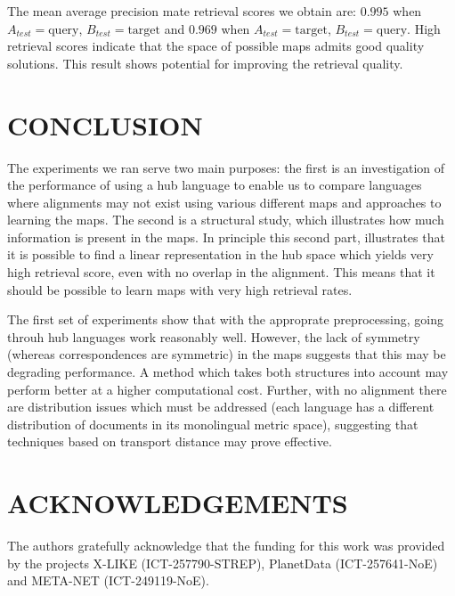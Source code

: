 \documentclass[twocolumn, draft]{article}
\begin{document}
The mean average precision mate retrieval scores we obtain are:
$0.995$ when $A_{test} = \text{query}$, $B_{test} =
\text{target}$ and $0.969$ when $A_{test} = \text{target}$,
$B_{test} = \text{query}$. High retrieval scores indicate that
the space of possible maps admits good quality solutions. This
result shows potential for improving the retrieval quality.
\vspace{-0.2cm}
\section{CONCLUSION}
\vspace{-0.2cm}
The experiments we ran serve two main purposes: the first is an
investigation of the performance of using a hub language to
enable us to compare languages where alignments may not exist
using various different maps and approaches to learning the
maps. The second is a structural study, which illustrates how
much information is present in the maps. In principle this second
part, illustrates that it is possible to find a
linear representation in the hub space which yields very high
retrieval score, even with no overlap in the alignment. This
means that it should be possible to learn maps with very high
retrieval rates.

The first set of experiments show that with the approprate
preprocessing, going throuh hub languages work reasonably
well. However, the lack of symmetry (whereas correspondences are
symmetric) in the maps suggests that this may be degrading
performance. A method which takes both structures into
account may perform better at a higher computational
cost. Further, with no alignment there are distribution issues
which must be addressed (each language has a different
distribution of documents in its monolingual metric space),
suggesting that techniques based on transport distance may prove
effective.
\vspace{-0.2cm}
\section{ACKNOWLEDGEMENTS}
\vspace{-0.2cm}
The authors gratefully acknowledge that the funding for this work was provided by the projects X-LIKE (ICT-257790-STREP), PlanetData (ICT-257641-NoE) and META-NET (ICT-249119-NoE).
\end{document}
